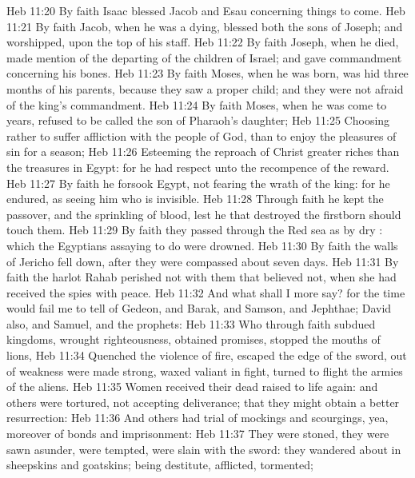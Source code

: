 \vs Heb 11:20 By faith Isaac blessed Jacob and Esau concerning things to come.
\vs Heb 11:21 By faith Jacob, when he was a dying, blessed both the sons of Joseph; and worshipped,  upon the top of his staff.
\vs Heb 11:22 By faith Joseph, when he died, made mention of the departing of the children of Israel; and gave commandment concerning his bones.
\vs Heb 11:23 By faith Moses, when he was born, was hid three months of his parents, because they saw  a proper child; and they were not afraid of the king's commandment.
\vs Heb 11:24 By faith Moses, when he was come to years, refused to be called the son of Pharaoh's daughter;
\vs Heb 11:25 Choosing rather to suffer affliction with the people of God, than to enjoy the pleasures of sin for a season;
\vs Heb 11:26 Esteeming the reproach of Christ greater riches than the treasures in Egypt: for he had respect unto the recompence of the reward.
\vs Heb 11:27 By faith he forsook Egypt, not fearing the wrath of the king: for he endured, as seeing him who is invisible.
\vs Heb 11:28 Through faith he kept the passover, and the sprinkling of blood, lest he that destroyed the firstborn should touch them.
\vs Heb 11:29 By faith they passed through the Red sea as by dry : which the Egyptians assaying to do were drowned.
\vs Heb 11:30 By faith the walls of Jericho fell down, after they were compassed about seven days.
\vs Heb 11:31 By faith the harlot Rahab perished not with them that believed not, when she had received the spies with peace.
\vs Heb 11:32 And what shall I more say? for the time would fail me to tell of Gedeon, and  Barak, and  Samson, and  Jephthae;  David also, and Samuel, and  the prophets:
\vs Heb 11:33 Who through faith subdued kingdoms, wrought righteousness, obtained promises, stopped the mouths of lions,
\vs Heb 11:34 Quenched the violence of fire, escaped the edge of the sword, out of weakness were made strong, waxed valiant in fight, turned to flight the armies of the aliens.
\vs Heb 11:35 Women received their dead raised to life again: and others were tortured, not accepting deliverance; that they might obtain a better resurrection:
\vs Heb 11:36 And others had trial of  mockings and scourgings, yea, moreover of bonds and imprisonment:
\vs Heb 11:37 They were stoned, they were sawn asunder, were tempted, were slain with the sword: they wandered about in sheepskins and goatskins; being destitute, afflicted, tormented;
